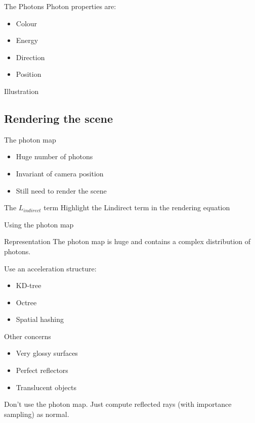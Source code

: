 \documentclass{beamer}
\begin{document}
			\begin{frame}{The Photons}
				Photon properties are:
				\begin{itemize}
					\item<2-> Colour
					\item<3-> Energy
					\item<4-> Direction
					\item<4-> Position
				\end{itemize}
			\end{frame}
			\begin{frame}{Illustration}\end{frame}

		\subsection{Rendering the scene}
			\begin{frame}{The photon map}
				\begin{itemize}
					\item<2-> Huge number of photons
					\item<3-> Invariant of camera position
					\item<4-> Still need to render the scene
				\end{itemize}
			\end{frame}

			\begin{frame}{The \(L_{indirect}\) term}
				Highlight the Lindirect term in the rendering equation
			\end{frame}

			\begin{frame}{Using the photon map}
			\end{frame}

			\begin{frame}{Representation}
				The photon map is huge and contains a complex distribution of photons.

				Use an acceleration structure:
				\begin{itemize}
					\item<2-> KD-tree
					\item<3-> Octree
					\item<4-> Spatial hashing
				\end{itemize}
			\end{frame}

			\begin{frame}{Other concerns}
				\begin{itemize}
					\item<2-> Very glossy surfaces
					\item<3-> Perfect reflectors
					\item<4-> Translucent objects
				\end{itemize}
				\pause Don't use the photon map. Just compute reflected rays (with importance sampling) as normal.
			\end{frame}
			
\end{document}
